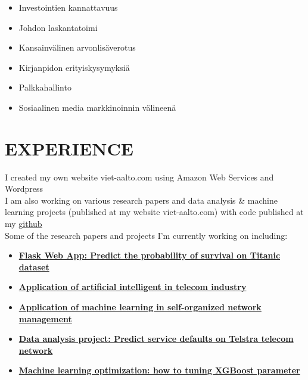 \documentclass[letterpaper]{twentysecondcv} %
\begin{document}
	
	
	
\newpage
\makenewprofile

\hspace{13pt}
\vspace{4mm} 

	\begin{multicols}{2}
	\begin{itemize}[noitemsep]
		\item Investointien kannattavuus
		\item Johdon laskantatoimi
		\item Kansainvälinen arvonlisäverotus
		\item Kirjanpidon erityiskysymyksiä
		\item Palkkahallinto
		\item Sosiaalinen media markkinoinnin välineenä
	\end{itemize} 
\end{multicols}
\section{EXPERIENCE}
I created my own website viet-aalto.com using Amazon Web Services and Wordpress \\

I am also working on various research papers and data analysis \& machine learning projects (published at my website viet-aalto.com)  with code published at my \href{github.com/vietaalto}{github} \\
Some of the research papers and projects I'm currently working on including:


\begin{itemize} %
	\item
	\href{http://viet-aalto.com/titanic/}{\textbf{Flask Web App: Predict the probability of survival on Titanic dataset}}
	\item
	\href{http://viet-aalto.com/index.php/2018/02/06/application-of-ai-in-telecom-industry/}{\textbf{Application of artificial intelligent in telecom industry}}
	\item \href{http://viet-aalto.com/index.php/2018/02/06/application-of-machine-learning-in-self-organized-network-management}{\textbf{Application of machine learning in self-organized network management}}
	\item
	\href{http://viet-aalto.com/index.php/2018/02/06/telstra-network-disruptions/}{\textbf{Data analysis project: Predict service defaults on Telstra telecom network}}
		\item
	\href{http://viet-aalto.com/index.php/2018/01/14/xgboost-tuning/}{\textbf{Machine learning optimization: how to tuning XGBoost parameter}}
\end{itemize}
\end{document}
